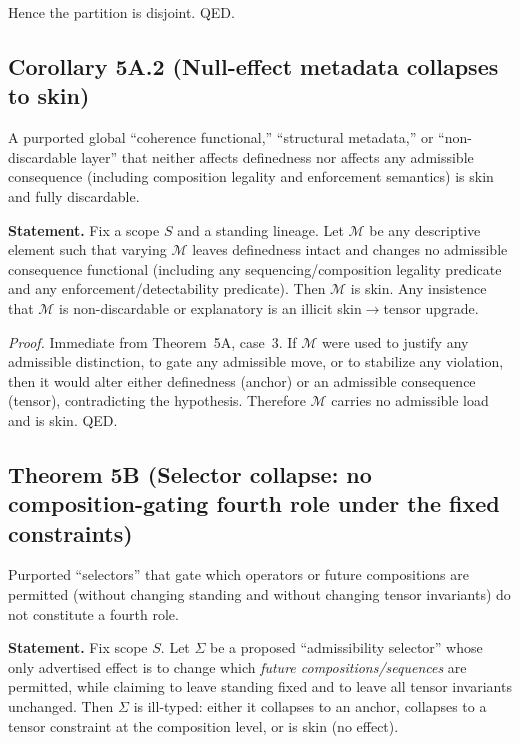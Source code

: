 \documentclass[12pt]{article}
\theoremstyle{plain}
\begin{document}
Hence the partition is disjoint. QED.


\subsection{Corollary 5A.2 (Null-effect metadata collapses to skin)}

A purported global ``coherence functional,'' ``structural metadata,'' or ``non-discardable layer'' that neither affects definedness nor affects any admissible consequence (including composition legality and enforcement semantics) is skin and fully discardable.

\medskip

\noindent\textbf{Statement.} Fix a scope $S$ and a standing lineage. Let $\mathcal{M}$ be any descriptive element such that varying $\mathcal{M}$ leaves definedness intact and changes no admissible consequence functional (including any sequencing/composition legality predicate and any enforcement/detectability predicate). Then $\mathcal{M}$ is skin. Any insistence that $\mathcal{M}$ is non-discardable or explanatory is an illicit skin$\to$tensor upgrade.

\textit{Proof.} Immediate from Theorem~5A, case~3. If $\mathcal{M}$ were used to justify any admissible distinction, to gate any admissible move, or to stabilize any violation, then it would alter either definedness (anchor) or an admissible consequence (tensor), contradicting the hypothesis. Therefore $\mathcal{M}$ carries no admissible load and is skin. QED.


\subsection{Theorem 5B (Selector collapse: no composition-gating fourth role under the fixed constraints)}

Purported ``selectors'' that gate which operators or future compositions are permitted (without changing standing and without changing tensor invariants) do not constitute a fourth role.

\medskip

\noindent\textbf{Statement.} Fix scope $S$. Let $\Sigma$ be a proposed ``admissibility selector'' whose only advertised effect is to change which \emph{future compositions/sequences} are permitted, while claiming to leave standing fixed and to leave all tensor invariants unchanged. Then $\Sigma$ is ill-typed: either it collapses to an anchor, collapses to a tensor constraint at the composition level, or is skin (no effect).
\end{document}
